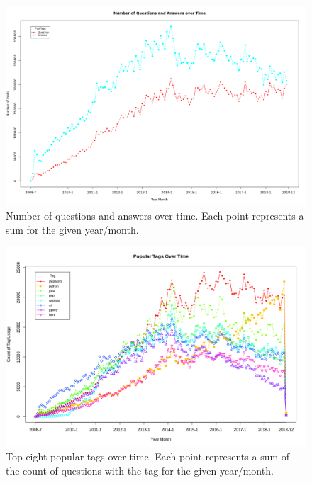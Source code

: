 \documentclass[a4paper,11pt, notitlepage]{report}
\theoremstyle{definition}
\numberwithin{equation}{section}		%
\begin{document}
\begin{figure}[ht]
    \centering
    \includegraphics[angle=270,width=5.5in]{figures/num_q_and_a_over_time.png}
    \caption{Number of questions and answers over time. Each point represents a sum for the given year/month.}
    \label{fig:q-and-a-over-time}
\end{figure}

\begin{figure}[ht]
    \centering
    \includegraphics[angle=270,width=5.5in]{figures/popular_tags_over_time.png}
    \caption{Top eight popular tags over time. Each point represents a sum of the count of questions with the tag for the given year/month.}
    \label{fig:popular-tags-over-time}
\end{figure}



\end{document}
